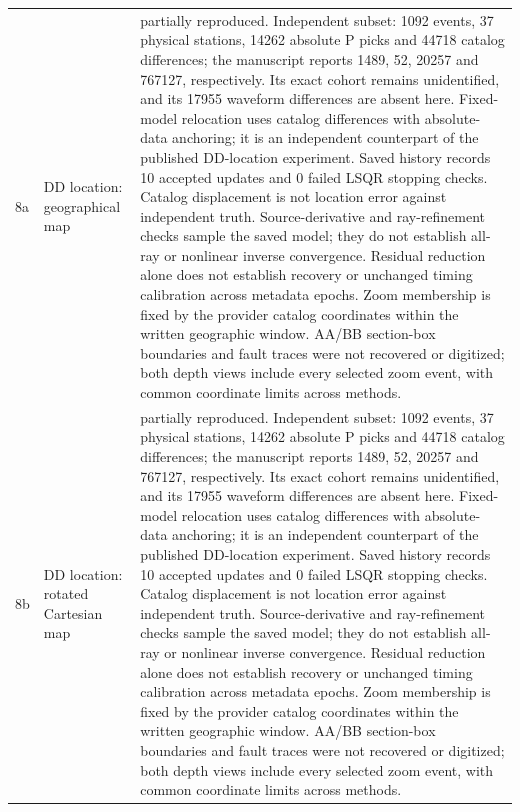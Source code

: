 \begin{longtable}{>{\raggedright\arraybackslash}p{}>{\raggedright\arraybackslash}p{}>{\raggedright\arraybackslash}p{}}
8a & DD location: geographical map & partially reproduced. Independent subset: 1092 events, 37 physical stations, 14262 absolute P picks and 44718 catalog differences; the manuscript reports 1489, 52, 20257 and 767127, respectively. Its exact cohort remains unidentified, and its 17955 waveform differences are absent here. Fixed-model relocation uses catalog differences with absolute-data anchoring; it is an independent counterpart of the published DD-location experiment. Saved history records 10 accepted updates and 0 failed LSQR stopping checks. Catalog displacement is not location error against independent truth. Source-derivative and ray-refinement checks sample the saved model; they do not establish all-ray or nonlinear inverse convergence. Residual reduction alone does not establish recovery or unchanged timing calibration across metadata epochs. Zoom membership is fixed by the provider catalog coordinates within the written geographic window. AA/BB section-box boundaries and fault traces were not recovered or digitized; both depth views include every selected zoom event, with common coordinate limits across methods.\\
8b & DD location: rotated Cartesian map & partially reproduced. Independent subset: 1092 events, 37 physical stations, 14262 absolute P picks and 44718 catalog differences; the manuscript reports 1489, 52, 20257 and 767127, respectively. Its exact cohort remains unidentified, and its 17955 waveform differences are absent here. Fixed-model relocation uses catalog differences with absolute-data anchoring; it is an independent counterpart of the published DD-location experiment. Saved history records 10 accepted updates and 0 failed LSQR stopping checks. Catalog displacement is not location error against independent truth. Source-derivative and ray-refinement checks sample the saved model; they do not establish all-ray or nonlinear inverse convergence. Residual reduction alone does not establish recovery or unchanged timing calibration across metadata epochs. Zoom membership is fixed by the provider catalog coordinates within the written geographic window. AA/BB section-box boundaries and fault traces were not recovered or digitized; both depth views include every selected zoom event, with common coordinate limits across methods.\\

\end{longtable}
